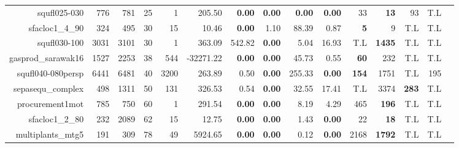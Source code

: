 \begin{table*}[t]
\begin{tabular}{|r|r|r|r|r||r||r|r|r|r||r|r|r|r|r|}
                     squfl025-030 &          776 &          781 &          25 &            1 &              205.50 &  \textbf{0.00} & \textbf{0.00} &  \textbf{0.00} & \textbf{0.00} &           33 &        \textbf{13} &           93 &          T.L \\ 
                  sfacloc1\_4\_90 &          324 &          495 &          30 &           15 &               10.46 &  \textbf{0.00} &          1.10 &          88.39 &          0.87 &   \textbf{5} &                  9 &          T.L &          T.L \\ 
                     squfl030-100 &         3031 &         3101 &          30 &            1 &              363.09 &         542.82 & \textbf{0.00} &           5.04 &         16.93 &          T.L &      \textbf{1435} &          T.L &          T.L \\ 
               gasprod\_sarawak16 &         1527 &         2253 &          38 &          544 &           -32271.22 &  \textbf{0.00} & \textbf{0.00} &          45.73 &          0.55 &  \textbf{60} &                232 &          T.L &          T.L \\ 
                squfl040-080persp &         6441 &         6481 &          40 &         3200 &              263.89 &           0.50 & \textbf{0.00} &         255.33 & \textbf{0.00} & \textbf{154} &               1751 &          T.L &          195 \\ 
                sepasequ\_complex &          498 &         1311 &          50 &          131 &              326.53 &           0.54 & \textbf{0.00} &          32.55 &         17.41 &          T.L &               3374 & \textbf{283} &          T.L \\ 
                  procurement1mot &          785 &          750 &          60 &            1 &              291.54 &  \textbf{0.00} & \textbf{0.00} &           8.19 &          4.29 &          465 &       \textbf{196} &          T.L &          T.L \\ 
                  sfacloc1\_2\_80 &          232 &         2089 &          62 &           15 &               12.75 &  \textbf{0.00} & \textbf{0.00} &           1.43 & \textbf{0.00} &           22 &        \textbf{18} &          T.L &          T.L \\ 
                multiplants\_mtg5 &          191 &          309 &          78 &           49 &             5924.65 &  \textbf{0.00} & \textbf{0.00} &           0.12 & \textbf{0.00} &         2168 &      \textbf{1792} &          T.L &          T.L \\ 

\end{tabular}
\end{table*}

